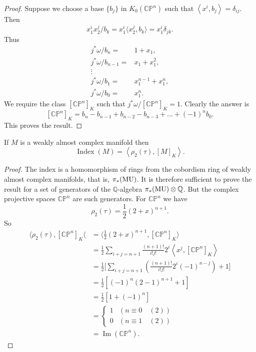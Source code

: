 \documentclass[../main]{subfiles}
\begin{document}
\begin{proof}
Suppose we choose a base $\{b_j\}$ in $K_0(\mathbb{CP}^n)$ such that $\left<x^i,b_j\right>=\delta_{ij}.$ Then 
\[x_1^ix_2^j/b_k=x_1^i\langle x_2^j,b_k\rangle =x_1^i\delta_{jk}.\]
Thus 
\begin{align}
    j^\ast \omega/b_n =& 1 + x_1, \nonumber \\
    j^\ast \omega/b_{n-1} =& x_1 + x_1^2, \nonumber \\
    \vdots& \nonumber\\
    j^\ast \omega/b_1 =& x_1^{n-1}+x_1^n, \nonumber \\
    j^\ast \omega/b_0 =& x_1^n. \nonumber
\end{align}
We require the class $[\mathbb{CP}^n]_K$ such that $j^\ast \omega/[\mathbb{CP}^n]_K=1$. Clearly the answer is
\[[\mathbb{CP}^n]_K=b_n-b_{n-1}+b_{n-2}-b_{n-3}+...+(-1)^n b_0.\]
This proves the result.
\end{proof}
\begin{theorem} \label{thm:p3ch11.16}
If $M$ is a weakly almost complex manifold then
\[\operatorname{Index}(M)=\left<\rho_2(\tau), [M]_K\right>.\]
\end{theorem}
\begin{proof}
The index is a homomorphism of rings from the cobordism ring of weakly almost complex manifolds, that is, $\pi_\ast(\mathrm{MU})$. It is therefore sufficient to prove the result for a set of generators of the $\mathbb{Q}$-algebra $\pi_\ast (\mathrm{MU})\otimes \mathbb{Q}$. But the complex projective spaces $\mathbb{CP}^n$ are such generators. For $\mathbb{CP}^n$ we have 
\[\rho_2(\tau)=\frac{1}{2}(2+x)^{n+1}.\]
So 
\begin{align*} 
\bigg\langle\rho_2(\tau),[\mathbb{CP}^n]_K\bigg\langle &= \bigg\langle\frac{1}{2}(2+x)^{n+1},[\mathbb{CP}^n]_K\bigg\rangle \nonumber \\
&= \frac{1}{2}\sum_{i+j=n+1}\frac{(n+1)!}{i!j!}2^i\left<x^j,[\mathbb{CP}^n]_K\right> \nonumber \\
&= \frac{1}{2}\bigg[\sum_{i+j=n+1}\left(\frac{(n+1)!}{i!j!}2^i(-1)^{n-j}\right) + 1\bigg] \nonumber \\
&= \frac{1}{2}\left[(-1)^n(2-1)^{n+1}+1\right] \nonumber \\
&= \frac{1}{2}\left[1+(-1)^n\right] \nonumber \\
&= \begin{cases}
  1  & (n\equiv 0 \quad (2)) \\
  0 & (n\equiv 1 \quad (2))
\end{cases} \nonumber \\
&=\operatorname{Im}(\mathbb{CP}^n).
\end{align*}
\end{proof}
\end{document}
